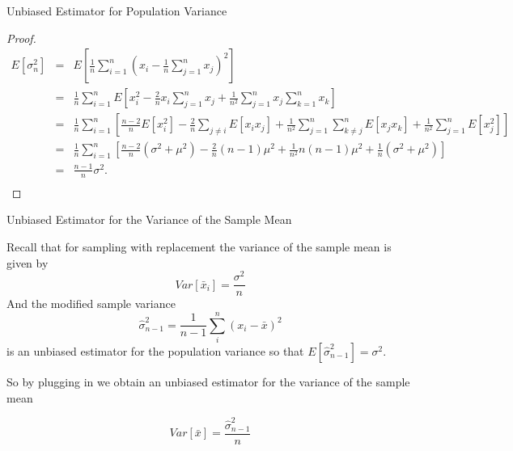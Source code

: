 \documentclass{beamer}
\numberwithin{equation}{section}
\begin{document}
\begin{frame}{Unbiased Estimator for Population Variance}
\scriptsize
\begin{proof}
\begin{eqnarray}
  E[\sigma_n^2] &=& E\left[ \frac 1n \sum_{i=1}^n \left(x_i - \frac 1n \sum_{j=1}^n x_j \right)^2 \right] \\ 
  & =& \frac 1n \sum_{i=1}^n E\left[ x_i^2 - \frac 2n x_i \sum_{j=1}^n x_j + \frac{1}{n^2} \sum_{j=1}^n x_j \sum_{k=1}^n x_k \right] \\ 
  & = &\frac 1n \sum_{i=1}^n \left[ \frac{n-2}{n} E[x_i^2] - \frac 2n \sum_{j \neq i} E[x_i x_j] + \frac{1}{n^2} \sum_{j=1}^n \sum_{k \neq j}^n E[x_j x_k] +\frac{1}{n^2} \sum_{j=1}^n E[x_j^2] \right] \\ 
  & =& \frac 1n \sum_{i=1}^n \left[ \frac{n-2}{n} (\sigma^2+\mu^2) - \frac 2n (n-1) \mu^2 + \frac{1}{n^2} n (n-1) \mu^2 + \frac 1n (\sigma^2+\mu^2) \right] \\ 
  & = &\frac{n-1}{n} \sigma^2. \\
\end{eqnarray}
\end{proof}
\end{frame}


\begin{frame}{Unbiased Estimator for the Variance of the Sample Mean}

\scriptsize

\begin{theorem}
Recall that for sampling with replacement the variance of the sample mean is given by
$$
Var[\bar{x}_i]= \frac{\sigma^2}{n}
$$
And the modified sample variance 
$$
\hat{\sigma}_{n-1}^2 = \frac{1}{n-1}   \sum_i^n (x_i-\bar{x})^2 
$$
is an unbiased estimator for the population variance so that $E[\hat{\sigma}_{n-1}^2 ]=\sigma^2$.\\\bigskip

So by plugging in we obtain an unbiased estimator for the variance of the sample mean

$$
Var[ \bar{x}] =  \frac{\hat{\sigma}_{n-1}^2}{n}
$$
\end{theorem}

\end{frame}
\end{document}
